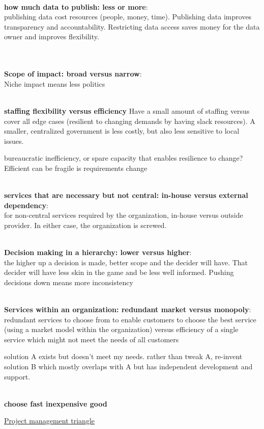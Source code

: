 \ \\

\textbf{how much data to publish: less or more}:\\
publishing data cost resources (people, money, time). Publishing data improves transparency and accountability. Restricting data access saves money for the data owner and improves flexibility. 

\ \\


\ \\

\textbf{Scope of impact: broad versus narrow}:\\
Niche impact means less politics

\ \\

\textbf{staffing flexibility versus efficiency}
Have a small amount of staffing versus cover all edge cases (resilient to changing demands by having slack resources). A smaller, centralized government is less costly, but also less sensitive to local issues. 

bureaucratic inefficiency, or spare capacity that enables resilience to change?
Efficient can be fragile is requirements change


\ \\

\textbf{services that are necessary but not central: in-house versus external dependency}:\\
for non-central services required by the organization, in-house versus outside provider. In either case, the organization is screwed.

\ \\

\textbf{Decision making in a hierarchy: lower versus higher}:\\
the higher up a decision is made, better scope and the decider will have. That decider will have less skin in the game and be less well informed. Pushing decisions down means more inconsistency

\ \\

\textbf{Services within an organization: redundant market versus monopoly}: \\
redundant services to choose from to enable customers to choose the best service (using a market model within the organization) versus efficiency of a single service which might not meet the needs of all customers

solution A exists but doesn't meet my needs. 
rather than tweak A, re-invent solution B which mostly overlaps with A but has independent development and support. 


\ \\

\textbf{choose fast inexpensive good}

\href{https://en.wikipedia.org/wiki/Project_management_triangle}{Project management triangle}